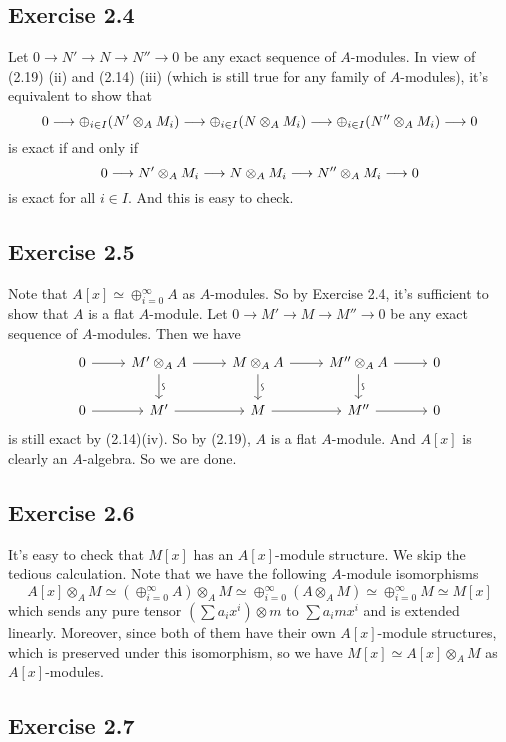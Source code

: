 \documentclass[../A&M.tex]{subfiles}
\begin{document}
\subsection*{Exercise 2.4}

Let $0 \to N' \to N \to N'' \to 0$ be any exact sequence of $A$-modules. In view of (2.19) (ii) and (2.14) (iii) (which is still true for any family of $A$-modules), it's equivalent to show that
$$
0 \longrightarrow \oplus_{i \in I} (N' \otimes_A M_i) \longrightarrow \oplus_{i \in I} (N \otimes_A M_i) \longrightarrow \oplus_{i \in I} (N'' \otimes_A M_i) \longrightarrow 0
$$
is exact if and only if
$$
0 \longrightarrow N' \otimes_A M_i \longrightarrow N \otimes_A M_i \longrightarrow N'' \otimes_A M_i \longrightarrow 0
$$
is exact for all $i\in I$. And this is easy to check.

\subsection*{Exercise 2.5}

Note that $A[x] \simeq \oplus_{i=0}^\infty A$ as $A$-modules. So by Exercise 2.4, it's sufficient to show that $A$ is a flat $A$-module. Let $0 \to M' \to M \to M'' \to 0$ be any exact sequence of $A$-modules. Then we have
$$
\begin{tikzcd}
0 \arrow{r} & M' \otimes_A A \arrow{r} \visoarrow{d} & M \otimes_A A \arrow{r} \visoarrow{d} & M'' \otimes_A A \arrow{r} \visoarrow{d} & 0 \\ 
0 \arrow{r} & M' \arrow{r} & M \arrow{r} & M'' \arrow[r] & 0
\end{tikzcd}
$$
is still exact by (2.14)(iv). So by (2.19), $A$ is a flat $A$-module. And $A[x]$ is clearly an $A$-algebra. So we are done.

\subsection*{Exercise 2.6}

It's easy to check that $M[x]$ has an $A[x]$-module structure. We skip the tedious calculation. Note that we have the following $A$-module isomorphisms
$$
A[x] \otimes_A M
\simeq (\oplus_{i=0}^\infty A) \otimes_A M
\simeq \oplus_{i=0}^\infty (A \otimes_A M)
\simeq \oplus_{i=0}^\infty M
\simeq M[x] 
$$
which sends any pure tensor $(\sum a_ix^i) \otimes m$ to $\sum a_imx^i$ and is extended linearly. Moreover, since both of them have their own $A[x]$-module structures, which is preserved under this isomorphism, so we have $M[x] \simeq A[x] \otimes_A M$ as $A[x]$-modules.

\subsection*{Exercise 2.7}
\end{document}
